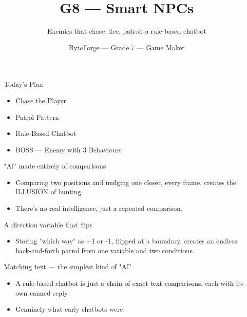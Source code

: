 \documentclass[aspectratio=169]{beamer}
\title{G8 — Smart NPCs}
\subtitle{Enemies that chase, flee, patrol; a rule-based chatbot}
\author{ByteForge --- Grade 7 --- Game Maker}
\date{}
\begin{document}
\begin{frame}
    \titlepage
\end{frame}

\begin{frame}{Today's Plan}
    \begin{itemize}
        \item Chase the Player
        \item Patrol Pattern
        \item Rule-Based Chatbot
        \item[$\bigstar$] BOSS --- Enemy with 3 Behaviours
    \end{itemize}
\end{frame}

\begin{frame}{"AI" made entirely of comparisons}
    \large
    \begin{itemize}
        \item Comparing two positions and nudging one closer, every frame, creates the ILLUSION of hunting
        \item There's no real intelligence, just a repeated comparison.
    \end{itemize}
\end{frame}


\begin{frame}{A direction variable that flips}
    \large
    \begin{itemize}
        \item Storing "which way" as +1 or -1, flipped at a boundary, creates an endless back-and-forth patrol from one variable and two conditions.
    \end{itemize}

    \begin{center}
    \end{center}
\end{frame}


\begin{frame}{Matching text — the simplest kind of "AI"}
    \large
    \begin{itemize}
        \item A rule-based chatbot is just a chain of exact text comparisons, each with its own canned reply
        \item Genuinely what early chatbots were.
    \end{itemize}
\end{frame}
\end{document}

